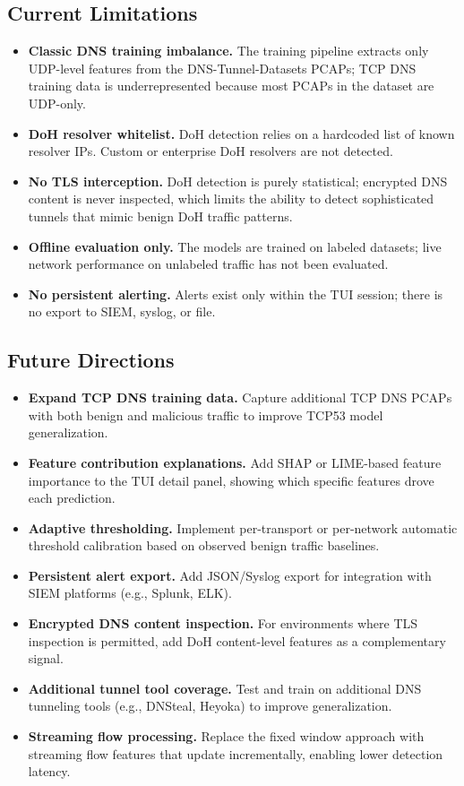 \documentclass[12pt,a4paper]{article}
\begin{document}
\subsection{Current Limitations}

\begin{itemize}
    \item \textbf{Classic DNS training imbalance.} The training pipeline extracts only UDP-level features from the DNS-Tunnel-Datasets PCAPs; TCP DNS training data is underrepresented because most PCAPs in the dataset are UDP-only.
    \item \textbf{DoH resolver whitelist.} DoH detection relies on a hardcoded list of known resolver IPs. Custom or enterprise DoH resolvers are not detected.
    \item \textbf{No TLS interception.} DoH detection is purely statistical; encrypted DNS content is never inspected, which limits the ability to detect sophisticated tunnels that mimic benign DoH traffic patterns.
    \item \textbf{Offline evaluation only.} The models are trained on labeled datasets; live network performance on unlabeled traffic has not been evaluated.
    \item \textbf{No persistent alerting.} Alerts exist only within the TUI session; there is no export to SIEM, syslog, or file.
\end{itemize}

\subsection{Future Directions}

\begin{itemize}
    \item \textbf{Expand TCP DNS training data.} Capture additional TCP DNS PCAPs with both benign and malicious traffic to improve TCP53 model generalization.
    \item \textbf{Feature contribution explanations.} Add SHAP or LIME-based feature importance to the TUI detail panel, showing which specific features drove each prediction.
    \item \textbf{Adaptive thresholding.} Implement per-transport or per-network automatic threshold calibration based on observed benign traffic baselines.
    \item \textbf{Persistent alert export.} Add JSON/Syslog export for integration with SIEM platforms (e.g., Splunk, ELK).
    \item \textbf{Encrypted DNS content inspection.} For environments where TLS inspection is permitted, add DoH content-level features as a complementary signal.
    \item \textbf{Additional tunnel tool coverage.} Test and train on additional DNS tunneling tools (e.g., DNSteal, Heyoka) to improve generalization.
    \item \textbf{Streaming flow processing.} Replace the fixed window approach with streaming flow features that update incrementally, enabling lower detection latency.
\end{itemize}
\end{document}
